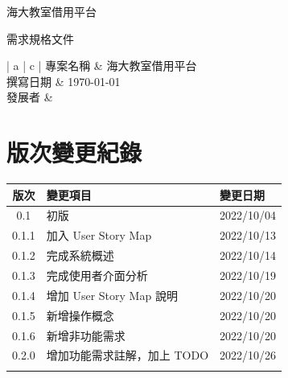 \documentclass{article}
\begin{document}
\begin{titlepage}
	\centering

	{\huge 海大教室借用平台}

	\vfill

	{\huge 需求規格文件}

	\vfill

	\begin{Large}
		\begin{center}
			\begin{tabular}{| a | c |}
				\hline
				專案名稱 & 海大教室借用平台               \\ \hline
				撰寫日期 & \today                 \\ \hline
				發展者  &  \\ \hline
			\end{tabular}
		\end{center}
	\end{Large}
\end{titlepage}


\section*{版次變更紀錄}

\begin{tabularx}{\textwidth}{| c | X | X |}
	\rowcolor{LightGray}
	\hline
	版次    & 變更項目                 & 變更日期       \\ \hline
	0.1   & 初版                   & 2022/10/04 \\ \hline
	0.1.1 & 加入 User Story Map    & 2022/10/13 \\ \hline
	0.1.2 & 完成系統概述               & 2022/10/14 \\ \hline
	0.1.3 & 完成使用者介面分析            & 2022/10/19 \\ \hline
	0.1.4 & 增加 User Story Map 說明 & 2022/10/20 \\ \hline
	0.1.5 & 新增操作概念               & 2022/10/20 \\ \hline
	0.1.6 & 新增非功能需求              & 2022/10/20 \\ \hline
	0.2.0 & 增加功能需求註解，加上 TODO     & 2022/10/26 \\ \hline
	      &                      &            \\ \hline
\end{tabularx}
\end{document}
